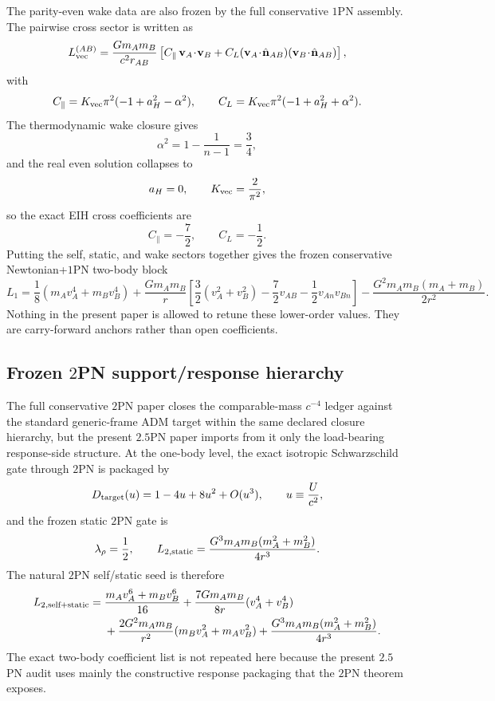 \documentclass[11pt]{article}
\begin{document}
The parity-even wake data are also frozen by the full conservative $1$PN assembly.  The
pairwise cross sector is written as
\[
L_{\rm vec}^{(AB)}
=
\frac{Gm_A m_B}{c^2r_{AB}}
\left[
C_\parallel\,\mathbf v_A\!\cdot\!\mathbf v_B
+
C_L(\mathbf v_A\!\cdot\!\hat{\mathbf n}_{AB})(\mathbf v_B\!\cdot\!\hat{\mathbf n}_{AB})
\right],
\]
with
\[
C_\parallel=K_{\rm vec}\pi^2(-1+a_H^2-\alpha^2),
\qquad
C_L=K_{\rm vec}\pi^2(-1+a_H^2+\alpha^2).
\]
The thermodynamic wake closure gives
\[
\alpha^2=1-\frac{1}{n-1}=\frac34,
\]
and the real even solution collapses to
\[
a_H=0,
\qquad
K_{\rm vec}=\frac{2}{\pi^2},
\]
so the exact EIH cross coefficients are
\[
C_\parallel=-\frac72,
\qquad
C_L=-\frac12.
\]
Putting the self, static, and wake sectors together gives the frozen conservative
Newtonian+$1$PN two-body block
\[
L_1=
\frac18(m_Av_A^4+m_Bv_B^4)
+\frac{Gm_A m_B}{r}
\left[
\frac32(v_A^2+v_B^2)-\frac72v_{AB}-\frac12v_{An}v_{Bn}
\right]
-\frac{G^2m_A m_B(m_A+m_B)}{2r^2}.
\]
Nothing in the present paper is allowed to retune these lower-order values.  They are
carry-forward anchors rather than open coefficients.

\subsection{Frozen \texorpdfstring{$2$}{2}PN support/response hierarchy}
\label{app:imported-lower-order-anchors-2pn}

The full conservative $2$PN paper closes the comparable-mass $c^{-4}$ ledger against the
standard generic-frame ADM target within the same declared closure hierarchy, but the
present $2.5$PN paper imports from it only the load-bearing response-side structure.
At the one-body level, the exact isotropic Schwarzschild gate through $2$PN is packaged by
\[
D_{\rm target}(u)=1-4u+8u^2+O(u^3),
\qquad
u\equiv \frac{U}{c^2},
\]
and the frozen static $2$PN gate is
\[
\lambda_\rho=\frac12,
\qquad
L_{2,\rm static}=\frac{G^3m_A m_B(m_A^2+m_B^2)}{4r^3}.
\]
The natural $2$PN self/static seed is therefore
\begin{align}
L_{2,\rm self+static}
={}&
\frac{m_Av_A^6+m_Bv_B^6}{16}
+\frac{7Gm_A m_B}{8r}(v_A^4+v_B^4)
\nonumber\\
&+\frac{2G^2m_A m_B}{r^2}(m_Bv_A^2+m_Av_B^2)
+\frac{G^3m_A m_B(m_A^2+m_B^2)}{4r^3}.
\end{align}
The exact two-body coefficient list is not repeated here because the present $2.5$PN audit
uses mainly the constructive response packaging that the $2$PN theorem exposes.
\end{document}

